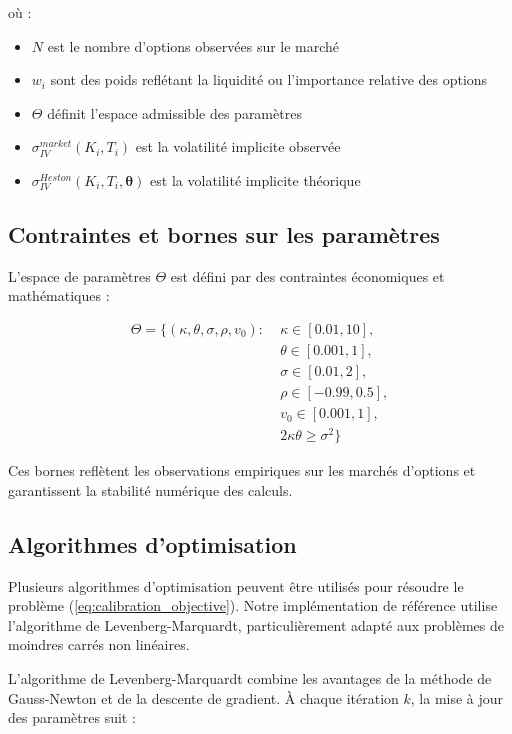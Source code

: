 où :
\begin{itemize}
\item $N$ est le nombre d'options observées sur le marché
\item $w_i$ sont des poids reflétant la liquidité ou l'importance relative des options
\item $\Theta$ définit l'espace admissible des paramètres
\item $\sigma_{IV}^{market}(K_i, T_i)$ est la volatilité implicite observée
\item $\sigma_{IV}^{Heston}(K_i, T_i, \boldsymbol{\theta})$ est la volatilité implicite théorique
\end{itemize}

\subsection{Contraintes et bornes sur les paramètres}

L'espace de paramètres $\Theta$ est défini par des contraintes économiques et mathématiques :

\begin{align}
\Theta = \{(\kappa, \theta, \sigma, \rho, v_0) : &\; \kappa \in [0.01, 10], \\
&\; \theta \in [0.001, 1], \\
&\; \sigma \in [0.01, 2], \\
&\; \rho \in [-0.99, 0.5], \\
&\; v_0 \in [0.001, 1], \\
&\; 2\kappa\theta \geq \sigma^2\}
\end{align}

Ces bornes reflètent les observations empiriques sur les marchés d'options et garantissent la stabilité numérique des calculs.

\subsection{Algorithmes d'optimisation}

Plusieurs algorithmes d'optimisation peuvent être utilisés pour résoudre le problème (\ref{eq:calibration_objective}). Notre implémentation de référence utilise l'algorithme de Levenberg-Marquardt, particulièrement adapté aux problèmes de moindres carrés non linéaires.

L'algorithme de Levenberg-Marquardt combine les avantages de la méthode de Gauss-Newton et de la descente de gradient. À chaque itération $k$, la mise à jour des paramètres suit :

